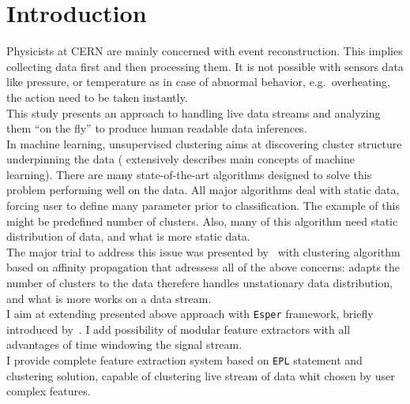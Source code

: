 \documentclass[11pt, letterpaper]{article}            %
\newcommand{\footrulecolor}[1]{\patchcmd{\footrule}{\hrule}{\color{#1}\hrule}{}{}} %
\begin{document}
\fancyfoot{} %
\renewcommand{\footrulewidth}{0.4pt} %
\footrulecolor{linec}

\section{Introduction}
Physicists at CERN are mainly concerned with event reconstruction. This implies collecting data first and then processing them. It is not possible with sensors data like pressure, or temperature as in case of abnormal behavior, e.g.\ overheating, the action need to be taken instantly.\\
This study presents an approach to handling live data streams and analyzing them ``on the fly'' to produce human readable data inferences.\\

In machine learning, unsupervised clustering aims at discovering cluster structure underpinning the data (\citep{Flach:2012:MLA:2490546} extensively describes main concepts of machine learning). There are many state-of-the-art algorithms designed to solve this problem performing well on the data. All major algorithms deal with static data, forcing user to define many parameter prior to classification. The example of this might be predefined number of clusters. Also, many of this algorithm need static distribution of data, and what is more static data.\\
The major trial to address this issue was presented by~\citep{zhang2013data} with clustering algorithm based on affinity propagation that adressess all of the above concerns: adapts the number of clusters to the data therefere handles unstationary data distribution, and what is more works on a data stream.\\
I aim at extending presented above approach with \texttt{Esper} framework, briefly introduced by~\citep{Marinescu2006}. I add possibility of modular feature extractors with all advantages of time windowing the signal stream.\\
I provide complete feature extraction system based on \texttt{EPL} statement and clustering solution, capable of clustering live stream of data whit chosen by user complex features.\\
\end{document}
